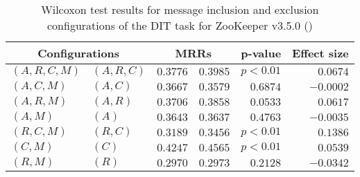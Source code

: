
\begin{table}
\begin{spacing}{1.2}
\centering
\caption{Wilcoxon test results for message inclusion and exclusion configurations of the DIT task for ZooKeeper v3.5.0 (\ctwo)}
\label{table:versus-wilcox-zookeeper-dit-message}
\begin{tabular}{ll|rr|rr}
\toprule
      \multicolumn{2}{c|}{Configurations} &                \multicolumn{2}{c|}{MRRs} &             p-value & Effect size \\
\midrule
 $(A,R,C,M)$ &  $(A,R,C)$ &       $0.3776$ &  $\bm{0.3985}$ & $p<0.01$ &    $0.0674$ \\
   $(A,C,M)$ &    $(A,C)$ &  $\bm{0.3667}$ &       $0.3579$ & $0.6874$ &   $-0.0002$ \\
   $(A,R,M)$ &    $(A,R)$ &       $0.3706$ &  $\bm{0.3858}$ & $0.0533$ &    $0.0617$ \\
     $(A,M)$ &      $(A)$ &  $\bm{0.3643}$ &       $0.3637$ & $0.4763$ &   $-0.0035$ \\
   $(R,C,M)$ &    $(R,C)$ &       $0.3189$ &  $\bm{0.3456}$ & $p<0.01$ &    $0.1386$ \\
     $(C,M)$ &      $(C)$ &       $0.4247$ &  $\bm{0.4565}$ & $p<0.01$ &    $0.0539$ \\
     $(R,M)$ &      $(R)$ &       $0.2970$ &  $\bm{0.2973}$ & $0.2128$ &   $-0.0342$ \\
\bottomrule
\end{tabular}

\end{spacing}
\end{table}

